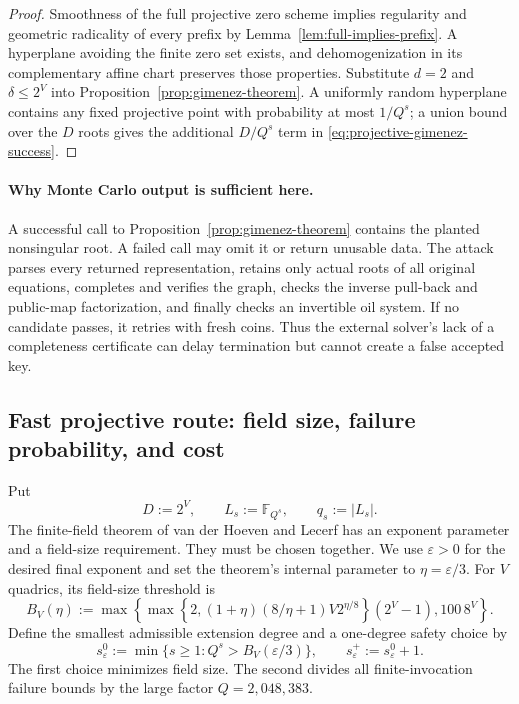 \documentclass[11pt,a4paper]{article}
\theoremstyle{definition}
\theoremstyle{remark}
\newcommand{\F}{\mathbb F}
\begin{document}
\begin{proof}
Smoothness of the full projective zero scheme implies regularity and geometric radicality of every prefix by Lemma~\ref{lem:full-implies-prefix}.  A hyperplane avoiding the finite zero set exists, and dehomogenization in its complementary affine chart preserves those properties.  Substitute $d=2$ and $\delta\le2^V$ into Proposition~\ref{prop:gimenez-theorem}.  A uniformly random hyperplane contains any fixed projective point with probability at most $1/Q^s$; a union bound over the $D$ roots gives the additional $D/Q^s$ term in \eqref{eq:projective-gimenez-success}.
\end{proof}

\paragraph{Why Monte Carlo output is sufficient here.}
A successful call to Proposition~\ref{prop:gimenez-theorem} contains the planted nonsingular root.  A failed call may omit it or return unusable data.  The attack parses every returned representation, retains only actual roots of all original equations, completes and verifies the graph, checks the inverse pull-back and public-map factorization, and finally checks an invertible oil system.  If no candidate passes, it retries with fresh coins.  Thus the external solver's lack of a completeness certificate can delay termination but cannot create a false accepted key.

\subsection{Fast projective route: field size, failure probability, and cost}\label{subsec:field}

Put
\[
 D:=2^V,\qquad L_s:=\F_{Q^s},\qquad q_s:=|L_s|.
\]
The finite-field theorem of van der Hoeven and Lecerf has an exponent parameter and a field-size requirement.  They must be chosen together.  We use $\varepsilon>0$ for the desired final exponent and set the theorem's internal parameter to $\eta=\varepsilon/3$.  For $V$ quadrics, its field-size threshold is
\begin{equation}\label{eq:vdhl-field-bound}
 B_V(\eta):=
 \max\!\left\{
 \max\!\left\{2,(1+\eta)(8/\eta+1)V2^{\eta/8}\right\}(2^V-1),
 100\,8^V
 \right\}.
\end{equation}
Define the smallest admissible extension degree and a one-degree safety choice by
\begin{equation}\label{eq:solver-extension-degree}
 s_\varepsilon^0:=\min\{s\ge1:Q^s>B_V(\varepsilon/3)\},
 \qquad
 s_\varepsilon^+:=s_\varepsilon^0+1.
\end{equation}
The first choice minimizes field size.  The second divides all finite-invocation failure bounds by the large factor $Q=2{,}048{,}383$.
\end{document}
